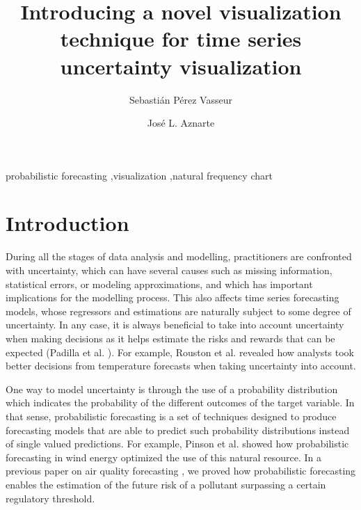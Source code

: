 \documentclass[a4paper,3p,sort&compress]{elsarticle}
\begin{document}
\linenumbers

\newcommand{\no}{NO\textsubscript{2}\xspace}
\newcommand{\ts}{\textsuperscript}

\begin{frontmatter}

  \title{Introducing a novel visualization technique for time series uncertainty visualization}


  \author{Sebasti\'an P\'erez Vasseur}
  \author{Jos\'e L. Aznarte}
  \address{Artificial Intelligence Department\\Universidad Nacional de
    Educaci\'on a Distancia --- UNED\\c/ Juan del Rosal, 16, Madrid, Spain}


\begin{abstract}

\end{abstract}

\begin{keyword}
probabilistic forecasting \sep visualization \sep natural frequency chart
\end{keyword}

\end{frontmatter}


\section{Introduction}
\label{sec:intro}

During all the stages of data analysis and modelling, practitioners are
confronted with uncertainty, which can have several causes such as missing
information, statistical errors, or modeling approximations, and which has
important implications for the modelling process. This also affects time series
forecasting models, whose regressors and estimations are naturally subject to
some degree of uncertainty. In any case, it is always beneficial to take into
account uncertainty when making decisions as it helps estimate the risks and
rewards that can be expected (Padilla et al. \cite{padilla_uncertainty_2021}).
For example, Rouston et al. \cite{roulston_laboratory_2006} revealed how
analysts took better decisions from temperature forecasts when taking
uncertainty into account.

One way to model uncertainty is through the use of a probability distribution
which indicates the probability of the different outcomes of the target
variable. In that sense, probabilistic forecasting is a set of techniques
designed to produce forecasting models that are able to predict such probability
distributions instead of single valued predictions. For example, Pinson et al.
\cite{pinson_non-parametric_2007} showed how probabilistic forecasting in wind
energy optimized the use of this natural resource. In a previous paper on air
quality forecasting \cite{vasseur_comparing_2021}, we proved how probabilistic
forecasting enables the estimation of the future risk of a pollutant surpassing
a certain regulatory threshold.
\end{document}

